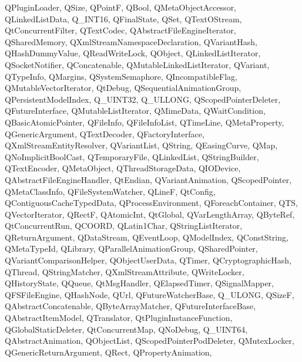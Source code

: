 {{    QPluginLoader,%
    QSize,%
    QPointF,%
    QBool,%
    QMetaObjectAccessor,%
    QLinkedListData,%
    Q_INT16,%
    QFinalState,%
    QSet,%
    QTextOStream,%
    QtConcurrentFilter,%
    QTextCodec,%
    QAbstractFileEngineIterator,%
    QSharedMemory,%
    QXmlStreamNamespaceDeclaration,%
    QVariantHash,%
    QHashDummyValue,%
    QReadWriteLock,%
    QObject,%
    QLinkedListIterator,%
    QSocketNotifier,%
    QConcatenable,%
    QMutableLinkedListIterator,%
    QVariant,%
    QTypeInfo,%
    QMargins,%
    QSystemSemaphore,%
    QIncompatibleFlag,%
    QMutableVectorIterator,%
    QtDebug,%
    QSequentialAnimationGroup,%
    QPersistentModelIndex,%
    Q_UINT32,%
    Q_ULLONG,%
    QScopedPointerDeleter,%
    QFutureInterface,%
    QMutableListIterator,%
    QMimeData,%
    QWaitCondition,%
    QBasicAtomicPointer,%
    QFileInfo,%
    QFileInfoList,%
    QTimeLine,%
    QMetaProperty,%
    QGenericArgument,%
    QTextDecoder,%
    QFactoryInterface,%
    QXmlStreamEntityResolver,%
    QVariantList,%
    QString,%
    QEasingCurve,%
    QMap,%
    QNoImplicitBoolCast,%
    QTemporaryFile,%
    QLinkedList,%
    QStringBuilder,%
    QTextEncoder,%
    QMetaObject,%
    QThreadStorageData,%
    QIODevice,%
    QAbstractFileEngineHandler,%
    QtEndian,%
    QVariantAnimation,%
    QScopedPointer,%
    QMetaClassInfo,%
    QFileSystemWatcher,%
    QLineF,%
    QtConfig,%
    QContiguousCacheTypedData,%
    QProcessEnvironment,%
    QForeachContainer,%
    QTS,%
    QVectorIterator,%
    QRectF,%
    QAtomicInt,%
    QtGlobal,%
    QVarLengthArray,%
    QByteRef,%
    QtConcurrentRun,%
    QCOORD,%
    QLatin1Char,%
    QStringListIterator,%
    QReturnArgument,%
    QDataStream,%
    QEventLoop,%
    QModelIndex,%
    QConstString,%
    QMetaTypeId,%
    QLibrary,%
    QParallelAnimationGroup,%
    QSharedPointer,%
    QVariantComparisonHelper,%
    QObjectUserData,%
    QTimer,%
    QCryptographicHash,%
    QThread,%
    QStringMatcher,%
    QXmlStreamAttribute,%
    QWriteLocker,%
    QHistoryState,%
    QQueue,%
    QtMsgHandler,%
    QElapsedTimer,%
    QSignalMapper,%
    QFSFileEngine,%
    QHashNode,%
    QUrl,%
    QFutureWatcherBase,%
    Q_ULONG,%
    QSizeF,%
    QAbstractConcatenable,%
    QByteArrayMatcher,%
    QFutureInterfaceBase,%
    QAbstractItemModel,%
    QTranslator,%
    QtPluginInstanceFunction,%
    QGlobalStaticDeleter,%
    QtConcurrentMap,%
    QNoDebug,%
    Q_UINT64,%
    QAbstractAnimation,%
    QObjectList,%
    QScopedPointerPodDeleter,%
    QMutexLocker,%
    QGenericReturnArgument,%
    QRect,%
    QPropertyAnimation,%
}}
